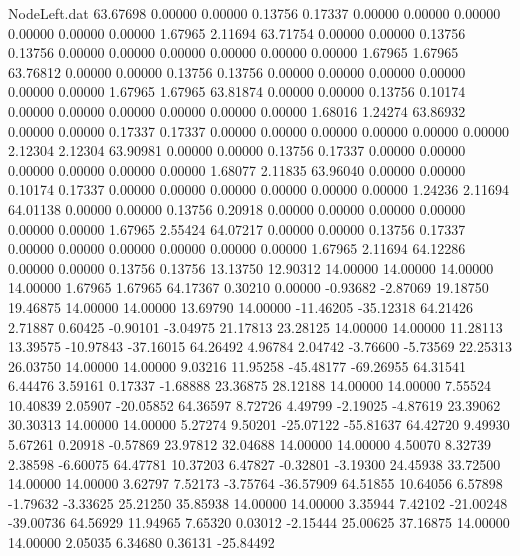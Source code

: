 \begin{filecontents}{NodeLeft.dat}
  63.67698    0.00000    0.00000     0.13756    0.17337    0.00000    0.00000    0.00000    0.00000    0.00000    0.00000    1.67965    2.11694
  63.71754    0.00000    0.00000     0.13756    0.13756    0.00000    0.00000    0.00000    0.00000    0.00000    0.00000    1.67965    1.67965
  63.76812    0.00000    0.00000     0.13756    0.13756    0.00000    0.00000    0.00000    0.00000    0.00000    0.00000    1.67965    1.67965
  63.81874    0.00000    0.00000     0.13756    0.10174    0.00000    0.00000    0.00000    0.00000    0.00000    0.00000    1.68016    1.24274
  63.86932    0.00000    0.00000     0.17337    0.17337    0.00000    0.00000    0.00000    0.00000    0.00000    0.00000    2.12304    2.12304
  63.90981    0.00000    0.00000     0.13756    0.17337    0.00000    0.00000    0.00000    0.00000    0.00000    0.00000    1.68077    2.11835
  63.96040    0.00000    0.00000     0.10174    0.17337    0.00000    0.00000    0.00000    0.00000    0.00000    0.00000    1.24236    2.11694
  64.01138    0.00000    0.00000     0.13756    0.20918    0.00000    0.00000    0.00000    0.00000    0.00000    0.00000    1.67965    2.55424
  64.07217    0.00000    0.00000     0.13756    0.17337    0.00000    0.00000    0.00000    0.00000    0.00000    0.00000    1.67965    2.11694
  64.12286    0.00000    0.00000     0.13756    0.13756   13.13750   12.90312   14.00000   14.00000   14.00000   14.00000    1.67965    1.67965
  64.17367    0.30210    0.00000    -0.93682   -2.87069   19.18750   19.46875   14.00000   14.00000   13.69790   14.00000  -11.46205  -35.12318
  64.21426    2.71887    0.60425    -0.90101   -3.04975   21.17813   23.28125   14.00000   14.00000   11.28113   13.39575  -10.97843  -37.16015
  64.26492    4.96784    2.04742    -3.76600   -5.73569   22.25313   26.03750   14.00000   14.00000    9.03216   11.95258  -45.48177  -69.26955
  64.31541    6.44476    3.59161     0.17337   -1.68888   23.36875   28.12188   14.00000   14.00000    7.55524   10.40839    2.05907  -20.05852
  64.36597    8.72726    4.49799    -2.19025   -4.87619   23.39062   30.30313   14.00000   14.00000    5.27274    9.50201  -25.07122  -55.81637
  64.42720    9.49930    5.67261     0.20918   -0.57869   23.97812   32.04688   14.00000   14.00000    4.50070    8.32739    2.38598   -6.60075
  64.47781   10.37203    6.47827    -0.32801   -3.19300   24.45938   33.72500   14.00000   14.00000    3.62797    7.52173   -3.75764  -36.57909
  64.51855   10.64056    6.57898    -1.79632   -3.33625   25.21250   35.85938   14.00000   14.00000    3.35944    7.42102  -21.00248  -39.00736
  64.56929   11.94965    7.65320     0.03012   -2.15444   25.00625   37.16875   14.00000   14.00000    2.05035    6.34680    0.36131  -25.84492

\end{filecontents}

